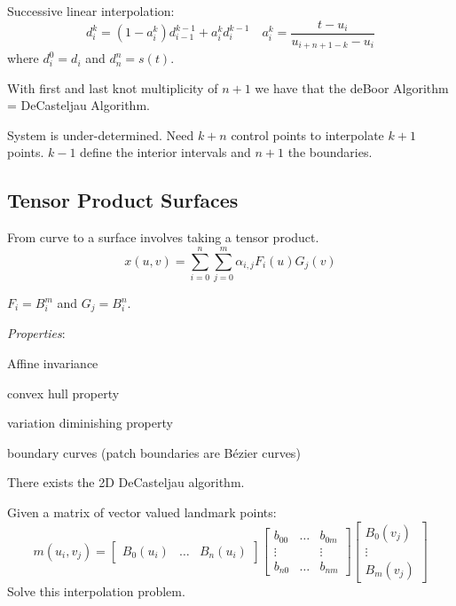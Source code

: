 \begin{algorithm}
  Successive linear interpolation:
  \[d_i^k = (1 - a_i^k)d_{i-1}^{k-1} + a_i^k d_i^{k-1} \quad a_i^k = \frac{t - u_i}{u_{i+n+1-k} - u_i}\]
  where \(d_i^0 = d_i\) and \(d_n^n = s(t)\).
\end{algorithm}

\begin{theorem}
  With first and last knot multiplicity of \(n+1\) we have that the deBoor Algorithm = DeCasteljau Algorithm.
\end{theorem}

\begin{definition}
  System is under-determined. Need \(k+n\) control points to interpolate \(k+1\) points. \(k-1\) define the interior intervals and \(n+1\) the boundaries.
\end{definition}

\subsection{Tensor Product Surfaces}
From curve to a surface involves taking a tensor product.
\[x(u, v) = \sum_{i=0}^{n}\sum_{j=0}^{m}\alpha_{i, j} F_i(u)G_j(v)\]

\begin{definition}
  \(F_i = B_i^m\) and \(G_j = B_i^n\).

  \textit{Properties}:
  \begin{itemize*}
    \item Affine invariance
    \item convex hull property
    \item variation diminishing property
    \item boundary curves (patch boundaries are Bézier curves)
  \end{itemize*}
\end{definition}

\begin{algorithm}[2D DeCasteljau]
  There exists the 2D DeCasteljau algorithm.
\end{algorithm}

\pagebreak
\begin{definition}
  Given a matrix of vector valued landmark points:
  \[m(u_i, v_j) = \begin{bmatrix}
    B_0(u_i) & \ldots & B_n(u_i)
  \end{bmatrix} \begin{bmatrix}
    b_{00} & \ldots & b_{0m} \\ \vdots && \vdots \\ b_{n0} & \ldots & b_{nm}
  \end{bmatrix} \begin{bmatrix}
    B_0(v_j) \\ \vdots \\ B_m(v_j)
  \end{bmatrix}\]
  Solve this interpolation problem.
\end{definition}

